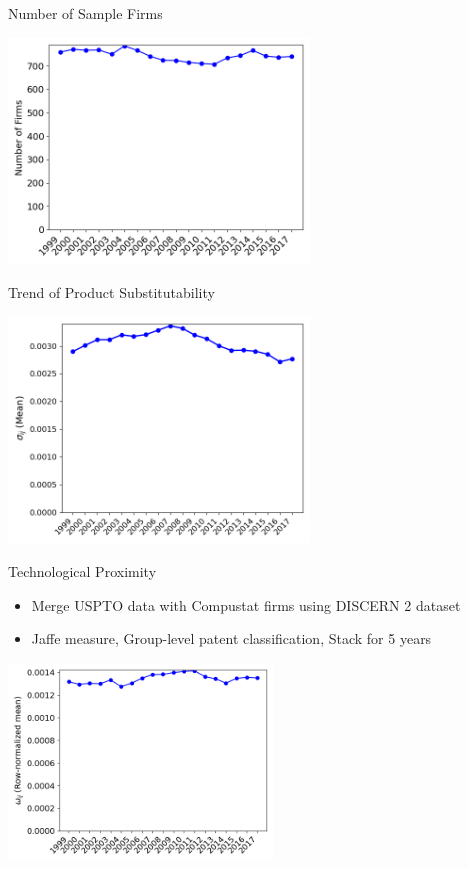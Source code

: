 \documentclass[english,aspectratio=169,handout]{beamer}
\theoremstyle{plain}
\begin{document}
%
\begin{frame}{Number of Sample Firms}
  \begin{center}
    \includegraphics[width=8cm]{figures/number_of_firm}
    \par\end{center}

\end{frame}

\begin{frame}{Trend of Product Substitutability}
  \begin{center}
    \includegraphics[width=8cm]{figures/sigma}
  \par\end{center}

\end{frame}

\begin{frame}{Technological Proximity }
  \begin{itemize}
    \item Merge USPTO data with Compustat firms using DISCERN 2 dataset \citep{Arora2024-ad}
    \item Jaffe measure, Group-level patent classification, Stack for 5 years
  \end{itemize}
  \begin{center}
    \includegraphics[width=7cm]{figures/omega}
    \par\end{center}
\end{frame}
\end{document}
